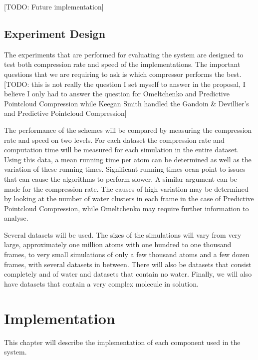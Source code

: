 \documentclass[a4paper,11pt]{report}
\begin{document}

[TODO: Future implementation]

\section{Experiment Design}

The experiments that are performed for evaluating the system are designed to test both compression rate and speed of the implementations. The important questions that we are requiring to ask is which compressor performs the best. [TODO: this is not really the question I set myself to answer in the proposal, I believe I only had to answer the question for Omeltchenko and Predictive Pointcloud Compression while Keegan Smith handled the Gandoin \& Devillier's and Predictive Pointcloud Compression]

The performance of the schemes will be compared by measuring the compression rate and speed on two levels. For each dataset the compression rate and computation time will be measured for each simulation in the entire dataset. Using this data, a mean running time per atom can be determined as well as the variation of these running times. Significant running times ocan point to issues that can cause the algorithms to perform slower. A similar argument can be made for the compression rate. The causes of high variation may be determined by looking at the number of water clusters in each frame in the case of Predictive Pointcloud Compression, while Omeltchenko may require further information to analyse.

Several datasets will be used. The sizes of the simulations will vary from very large, approximately one million atoms with one hundred to one thousand frames, to very small simulations of only a few thousand atoms and a few dozen frames, with several datasets in between. There will also be datasets that consist completely and of water and datasets that contain no water. Finally, we will also have datasets that contain a very complex molecule in solution.

\chapter{Implementation}

This chapter will describe the implementation of each component used in the system.
\end{document}
